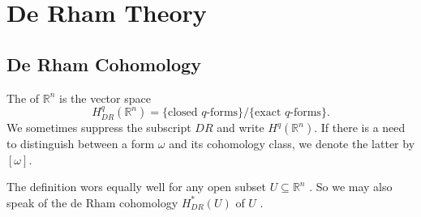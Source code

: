 \documentclass[../main.tex]{subfiles}
\begin{document}
\ifSubfilesClassLoaded{

    \tableofcontents
    
}{}

\chapter{ De Rham Theory}

\section{De Rham Cohomology}
\begin{definition}{}{}
The  of $\mathbb{R}^n$ is the vector space
\[
H_{DR}^q(\mathbb{R}^n) = \{\text{closed } q\text{-forms}\}/\{\text{exact } q\text{-forms}\}.
\]
We sometimes suppress the subscript $DR$ and write $H^q(\mathbb{R}^n)$. If there is a need to distinguish between a form $\omega$ and its cohomology class, we denote the latter by $[\omega]$.
\end{definition}

\begin{remark}
    The definition wors equally well for any open subset \(  U \subseteq \mathbb{R} ^{n}  \) . So we may also speak of the de Rham cohomology \(  H_{DR}^{*}\left( U \right)   \) of \(  U  \) .    
\end{remark}
\end{document}
